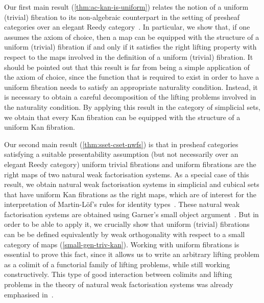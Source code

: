\documentclass[reqno,10pt,a4paper,oneside,draft]{amsart}
\begin{document}
Our first main result (\cref{thm:ac-kan-is-uniform}) relates the notion of a uniform (trivial) fibration to its non-algebraic counterpart in the setting of presheaf categories over an elegant Reedy category~\cite{bergner-rezk-elegant}.
In particular, we show that, if one assumes the axiom of choice, then a map can be equipped with the structure of a uniform (trivial) fibration if and only if it satisfies the right lifting property with respect to the maps involved in the definition of a uniform (trivial) fibration.
It should be pointed out that this result is far from being a simple application of the axiom of choice, since the function 
that is required to exist in order to have a uniform fibration needs to satisfy an appropriate naturality condition.
Instead, it is necessary to obtain a careful decomposition of the lifting problems involved in the naturality condition.
By applying this result in the category of simplicial sets, we obtain that every Kan fibration can be equipped with the structure of a uniform Kan fibration.

Our second main result (\cref{thm:sset-cset-nwfs}) is that in presheaf categories satisfying a suitable presentability assumption (but not necessarily over an elegant Reedy category) uniform trivial fibrations and uniform fibrations are the right maps of two natural weak factorisation systems. As a special case of this result, we obtain natural weak factorisation systems in simplicial and cubical sets that have uniform Kan fibrations as the right maps, which are of interest for the interpretation of Martin-L\"of's rules for identity types~\cite{awodey-warren:homotopy-idtype,gambino-garner:idtypewfs,warren:thesis,garner:topological-simplicial,shulman:inverse-diagrams}.
These natural weak factorisation systems are obtained using Garner's small object argument~\cite{garner:small-object-argument}. 
But in order to be able to apply it, we crucially show that uniform (trivial) fibrations can be be defined equivalently by weak orthogonality with respect to a small category of maps (\cref{small-gen-triv-kan}).
Working with uniform fibrations is essential to prove this fact, since it allows us to write an arbitrary lifting problem as a colimit of a functorial family of lifting problems, while still working constructively.
This type of good interaction between colimits and lifting problems in the theory of natural weak factorisation systems was already emphasised in~\cite{riehl-cat-homotopy}.
\end{document}
